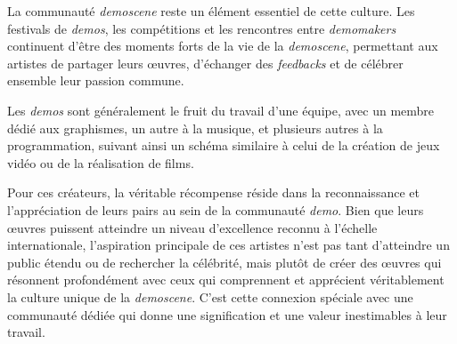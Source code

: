 La communauté \textit{demoscene} reste un élément essentiel de cette culture. Les festivals de \textit{demos}, les compétitions et les rencontres entre \textit{demomakers} continuent d'être des moments forts de la vie de la \textit{demoscene}, permettant aux artistes de partager leurs œuvres, d'échanger des \textit{feedbacks} et de célébrer ensemble leur passion commune.

Les \textit{demos} sont généralement le fruit du travail d'une équipe, avec un membre dédié aux graphismes, un autre à la musique, et plusieurs autres à la programmation, suivant ainsi un schéma similaire à celui de la création de jeux vidéo ou de la réalisation de films.

Pour ces créateurs, la véritable récompense réside dans la reconnaissance et l'appréciation de leurs pairs au sein de la communauté \textit{demo}. Bien que leurs œuvres puissent atteindre un niveau d'excellence reconnu à l'échelle internationale, l'aspiration principale de ces artistes n'est pas tant d'atteindre un public étendu ou de rechercher la célébrité, mais plutôt de créer des œuvres qui résonnent profondément avec ceux qui comprennent et apprécient véritablement la culture unique de la \textit{demoscene}. C'est cette connexion spéciale avec une communauté dédiée qui donne une signification et une valeur inestimables à leur travail.



